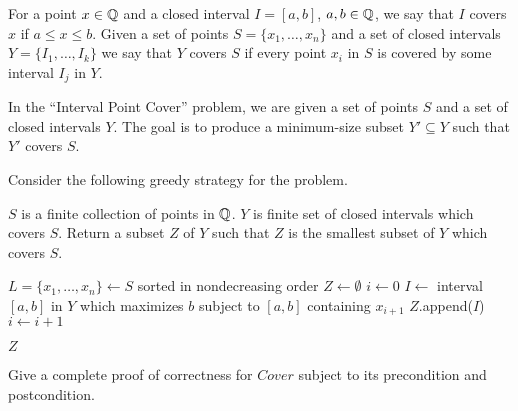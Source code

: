 
For a point $x \in \mathbb{Q}$ and a closed interval 
$I = [a,b]$, $a, b \in \mathbb{Q}$, we say that 
$I$ {covers} $x$ if $a \le x \le b$. 
Given a set of points $S = \{x_1,\dots,x_n\}$ 
and a set of closed intervals $Y = \{I_1,\dots,I_k\}$ 
we say that $Y$ covers $S$ if every point 
$x_i$ in $S$ is covered by some interval $I_j$ in $Y$.

In the ``Interval Point Cover'' problem, we are 
given a set of points $S$ and a set of closed 
intervals $Y$. The goal is to produce a minimum-size 
subset $Y' \subseteq Y$ such that $Y'$ covers $S$.

Consider the following greedy strategy for the problem.

\begin{minipage}{\linewidth}
    \begin{algorithm}[H]
        \caption{$Cover(S,Y)$}
        \begin{algorithmic}[1]

            \vspace{.5 em}
            \Require 
            \Statex
                $S$ is a finite collection of points in $\mathbb{Q}$.
                $Y$ is finite set of closed intervals which covers $S$.
            \Ensure
            \Statex Return a subset $Z$ of $Y$ such that
            $Z$ is the smallest subset of $Y$ which covers $S$.
            \vspace{.5 em}

            \State $L = \{x_1,\dots,x_n\} \gets S$ sorted 
            in nondecreasing order
            \State $Z \gets \emptyset$
            \State $i \gets 0$
                \State $I \gets$ interval $[ a, b ]$ in $Y$ 
                which maximizes $b$ subject to $[a, b]$ containing $x_{i+1}$
                \State $Z$.append($I$)
                \State $i \gets i + 1$
            \EndIf
            \EndWhile

            \State\Return $Z$

            \vspace{.5 em}
        \end{algorithmic}
    \end{algorithm}
\end{minipage}

\vspace{1 em}
Give a complete proof of correctness for $Cover$
subject to its precondition and postcondition.

